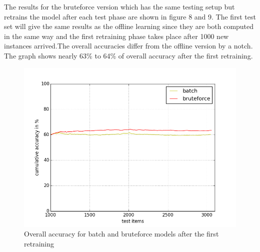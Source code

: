 \documentclass{article} %
\begin{document}
The results for the bruteforce version which has the same testing setup but retrains the model after each test phase are shown in figure 8 and 9. The first test set will give the same results as the offline learning since they are both computed in the same way and the first retraining phase takes place after 1000 new instances arrived.The overall accuracies differ from the offline version by a notch. The graph shows nearly 63\% to 64\% of overall accuracy after the first retraining.
\newpage
\begin{figure}[htbp]
  \centering
  \includegraphics[scale=0.5]{./plots/overallBatchBruteforce.png}
  \caption{Overall accuracy for batch and bruteforce models after the first retraining}
\end{figure}
\end{document}
